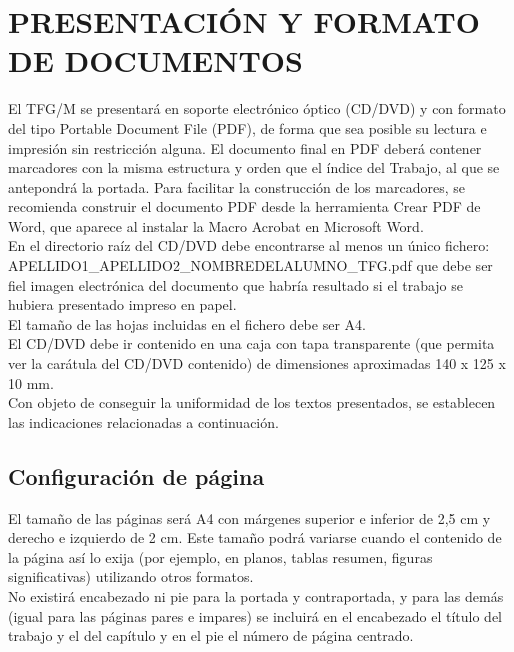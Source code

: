 \section{PRESENTACIÓN Y FORMATO DE DOCUMENTOS} \label{sec:presentacion}
El TFG/M se presentará en soporte electrónico óptico (CD/DVD) y con formato del tipo Portable Document File (PDF), de forma que sea posible su lectura e impresión sin restricción alguna. El documento final en PDF deberá contener marcadores con la misma estructura y orden que el índice del Trabajo, al que se antepondrá la portada. Para facilitar la construcción de los marcadores, se recomienda construir el documento PDF desde la herramienta Crear PDF de Word, que aparece al instalar la Macro Acrobat en Microsoft Word. \\

En el directorio raíz del CD/DVD debe encontrarse al menos un único fichero: APELLIDO1\_APELLIDO2\_NOMBREDELALUMNO\_TFG.pdf que debe ser fiel imagen electrónica del documento que habría resultado si el trabajo se hubiera presentado impreso en papel.\\

El tamaño de las hojas incluidas en el fichero debe ser A4. \\

El CD/DVD debe ir contenido en una caja con tapa transparente (que permita ver la carátula del CD/DVD contenido) de dimensiones aproximadas 140 x 125 x 10 mm.\\

Con objeto de conseguir la uniformidad de los textos presentados, se establecen las indicaciones relacionadas a continuación.\\

\subsection{Configuración de página} \label{sec:configuracion}
El tamaño de las páginas será A4 con márgenes superior e inferior de 2,5 cm y derecho e izquierdo de 2 cm. Este tamaño podrá variarse cuando el contenido de la página así lo exija (por ejemplo, en planos, tablas resumen, figuras significativas) utilizando otros formatos.\\

No existirá encabezado ni pie para la portada y contraportada, y para las demás (igual para las páginas pares e impares) se incluirá en el encabezado el título del trabajo y el del capítulo y en el pie el número de página centrado. \\

